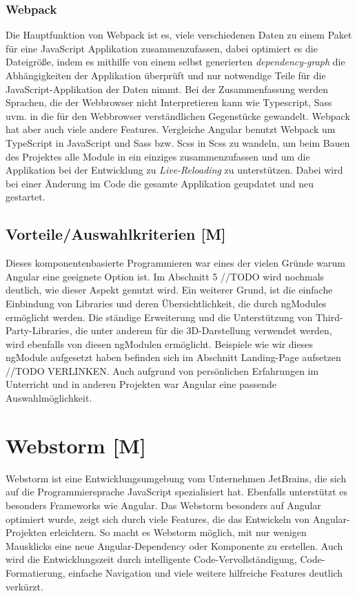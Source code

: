 \subsubsection{Webpack}
Die Hauptfunktion von Webpack ist es, viele verschiedenen Daten zu einem Paket für eine JavaScript Applikation zusammenzufassen, dabei optimiert es die Dateigröße, indem es mithilfe von einem selbst generierten \emph{dependency-graph} die Abhängigkeiten der Applikation überprüft und nur notwendige Teile für die JavaScript-Applikation der Daten nimmt. Bei der Zusammenfassung werden Sprachen, die der Webbrowser nicht Interpretieren kann wie Typescript, Sass uvm. in die für den Webbrowser verständlichen Gegenstücke gewandelt. Webpack hat aber auch viele andere Features. Vergleiche \cite{Webpack}
Angular benutzt Webpack um TypeScript in JavaScript und Sass bzw. Scss in Scss zu wandeln, um beim Bauen des Projektes alle Module in ein einziges zusammenzufassen und um die Applikation bei der Entwicklung zu \emph{Live-Reloading} zu unterstützen. Dabei wird bei einer Änderung im Code die gesamte Applikation geupdatet und neu gestartet. 

\subsection{Vorteile/Auswahlkriterien [M]}
Dieses komponentenbasierte Programmieren war eines der vielen Gründe 
warum Angular eine geeignete Option ist. Im Abschnitt 5 //TODO  wird nochmals deutlich, wie dieser Aspekt genutzt wird. Ein weiterer Grund, ist die einfache Einbindung von 
Libraries und deren Übersichtlichkeit, die durch ngModules ermöglicht werden. Die ständige Erweiterung und die Unterstützung von Third-Party-Libraries, die unter anderem für die 3D-Darstellung verwendet werden, wird ebenfalls von diesen ngModulen ermöglicht. Beispiele wie wir dieses ngModule aufgesetzt haben befinden sich im Abschnitt Landing-Page aufsetzen //TODO VERLINKEN. Auch aufgrund von persönlichen Erfahrungen im Unterricht und in anderen Projekten war Angular eine passende Auswahlmöglichkeit. 
\cite{AngularNgModules}



\section{Webstorm [M]}
Webstorm ist eine Entwicklungsumgebung vom Unternehmen JetBrains, die sich auf die Programmiersprache JavaScript spezialisiert hat. Ebenfalls unterstützt es besonders Frameworks wie Angular. Das Webstorm besonders auf Angular optimiert wurde, zeigt sich durch viele Features, die das Entwickeln von Angular-Projekten erleichtern. So macht es Webstorm möglich, mit nur wenigen Mausklicks eine neue Angular-Dependency oder Komponente zu erstellen. Auch wird die Entwicklungszeit durch intelligente Code-Vervollständigung, Code-Formatierung, einfache Navigation und viele weitere hilfreiche Features deutlich verkürzt. 
\cite{Webstorm}

